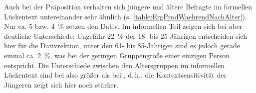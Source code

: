 Auch bei der Präposition \waehrend{} verhalten sich jüngere und ältere Befragte im formellen Lückentext untereinander sehr ähnlich (s. \autoref{table:ErgProdWaehrendNachAlter}). 
Nur ca. 5 bzw. 4~\% setzen den Dativ.
Im informellen Teil zeigen sich bei \waehrend{} aber deutliche Unterschiede:
Ungefähr 22~\% der 18- bis 25-Jährigen entscheiden sich hier für die Dativrektion, unter den 61- bis 85-Jährigen sind es jedoch gerade einmal ca. 2~\%, was bei der geringen Gruppengröße einer einzigen Person entspricht. 
Die Unterschiede zwischen den Altersgruppen im informellen Lückentext sind bei \waehrend{} also größer als bei \wegen, d.\,h., die Kontextsensitivität der Jüngeren zeigt sich hier noch stärker. 
